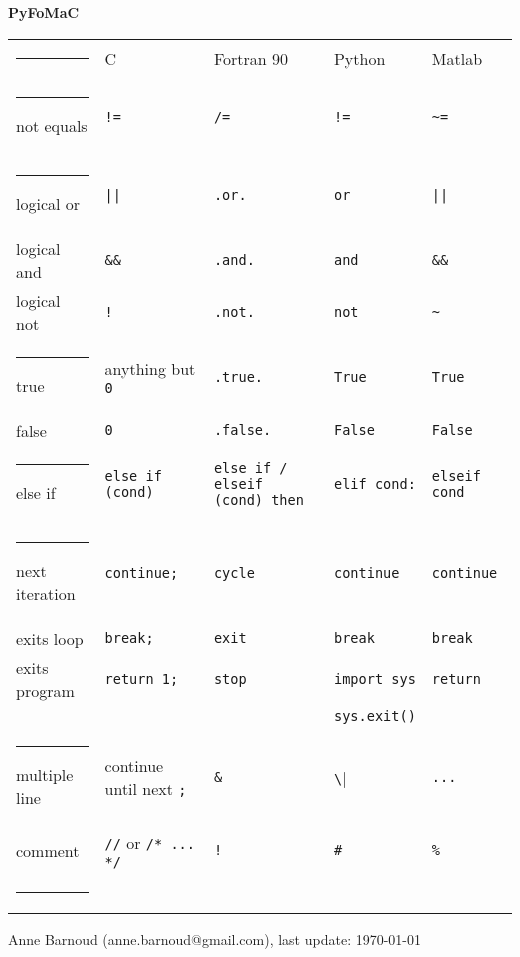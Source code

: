\documentclass[a5paper,10pt,landscape]{article}
\makeatletter
\def\hlinewd#1{%
\noalign{\ifnum0=`}\fi\hrule \@height #1 %
\futurelet\reserved@a\@xhline}
\newcommand{\hhline}{\hlinewd{1pt}}	%
\renewcommand{\hline}{\hlinewd{0.1pt}}	%
\makeatother
\begin{document}
\pagestyle{empty}

\begin{center}

\Huge{\textbf{PyFoMaC}}
\normalsize

\bigskip

\bigskip

\begin{tabular}{p{2.5cm} p{3.5cm} p{5.5cm} p{2cm} p{2cm}}
\hhline
 			& C		& Fortran 90		& Python 		& Matlab 	\\ 
\hhline
not equals		& \verb|!=|		& \verb|/=| 	& \verb|!=| 		& \verb|~=|	\\
\hline
logical or		& \verb=||=		& \texttt{.or.}	& \verb|or| 		& \verb=||= 	\\
logical and		& \verb|&&|		& \texttt{.and.} 	& \verb|and| 		& \verb|&&| 	\\
logical not		& \verb|!|		& \texttt{.not.} 	& \verb|not| 		& \verb|~| 	\\
\hline
true			& anything but \verb|0| & \texttt{.true.} 	& \verb|True| 		& \verb|True| 		\\
false		& \verb|0|			& \texttt{.false.} 	& \verb|False| 		& \verb|False| 		\\
\hline
else if		& \verb|else if (cond)|	& \verb|else if / elseif (cond) then| & \verb|elif cond:| & \verb|elseif cond|								\\
\hline
%
next iteration	& \verb|continue;|	& \verb|cycle| 		& \verb|continue| 	& \verb|continue| 	\\
exits loop		& \verb|break;|		& \verb|exit| 	& \verb|break| 		& \verb|break| 	\\	
exits program	& \verb|return 1;|	& \verb|stop| & \verb|import sys| & \verb|return|	\\
& & & \verb|sys.exit()| & \\
\hline
multiple line & continue until next \verb|;|	& \verb|&| 	& \verb|\| 		& \verb|...| 		\\
comment & \verb|//| or \verb|/* ... */| & \verb|!| & \verb|#| & \verb|%| \\
\hhline
\end{tabular}
\end{center}

\vfill
Anne Barnoud (anne.barnoud@gmail.com), last update: \today
\end{document}
